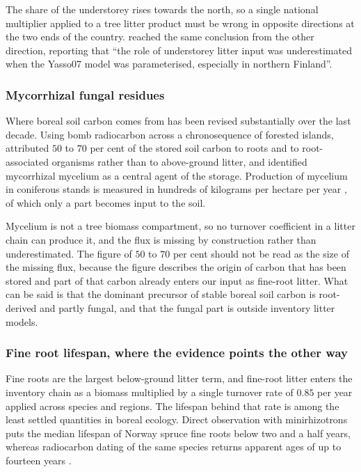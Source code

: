 \documentclass[11pt]{article}
\begin{document}
The share of the understorey rises towards the north, so a single national
multiplier applied to a tree litter product must be wrong in opposite directions at
the two ends of the country. \citet{Lehtonen2016} reached the same conclusion from
the other direction, reporting that ``the role of understorey litter input was
underestimated when the Yasso07 model was parameterised, especially in northern
Finland''.

\subsubsection{Mycorrhizal fungal residues}

Where boreal soil carbon comes from has been revised substantially over the last
decade. Using bomb radiocarbon across a chronosequence of forested islands,
\citet{Clemmensen2013} attributed $50$ to $70$ per cent of the stored soil carbon to
roots and to root-associated organisms rather than to above-ground litter, and
identified mycorrhizal mycelium as a central agent of the storage. Production of
mycelium in coniferous stands is measured in hundreds of kilograms per hectare per
year \citep{Ekblad2013,Hagenbo2017}, of which only a part becomes input to the soil.

Mycelium is not a tree biomass compartment, so no turnover coefficient in a litter
chain can produce it, and the flux is missing by construction rather than
underestimated. The figure of $50$ to $70$ per cent should not be read as the size
of the missing flux, because the figure describes the origin of carbon that has been
stored and part of that carbon already enters our input as fine-root litter. What
can be said is that the dominant precursor of stable boreal soil carbon is
root-derived and partly fungal, and that the fungal part is outside inventory litter
models.

\subsubsection{Fine root lifespan, where the evidence points the other way}

Fine roots are the largest below-ground litter term, and fine-root litter enters the
inventory chain as a biomass multiplied by a single turnover rate of $0.85$ per year
applied across species and regions. The lifespan behind that rate is among the least
settled quantities in boreal ecology. Direct observation with minirhizotrons puts the
median lifespan of Norway spruce fine roots below two and a half years, whereas
radiocarbon dating of the same species returns apparent ages of up to fourteen years
\citep{Strand2008}.
\end{document}
